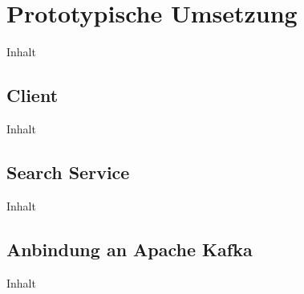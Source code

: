 \chapter{Prototypische Umsetzung\label{chap5:Fuenftes-Kapitel}}

Inhalt

\section{Client\label{sec5.1:Unterpunkt-1}}

Inhalt

\section{Search Service\label{sec5.2:Unterpunkt-2}}

Inhalt

\section{Anbindung an Apache Kafka\label{sec5.3:Unterpunkt-3}}

Inhalt